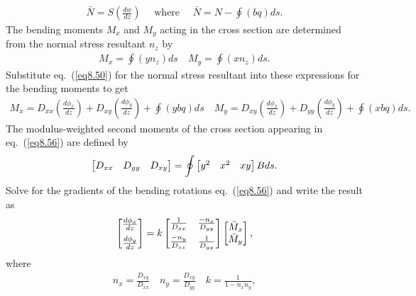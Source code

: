\documentclass{AeroStructure-ERJohnson}
\begin{document}
\begin{align}\label{eq8.54}
\bar{N}=S\left(\frac{d w}{d z}\right) \quad \text { where } \quad
\bar{N}=N-\oint(b q) d s.
\end{align}
The bending moments $M_x$ and $M_y$ acting in the cross section
are determined from the normal stress resultant $n_{z}$ by
\begin{align}\label{eq8.55}
M_{x}=\oint\left(y n_{z}\right) d s \quad M_{y}=\oint\left(x
n_{z}\right) d s.
\end{align}
Substitute eq.~(\ref{eq8.50}) for the normal stress resultant into
these expressions for the bending moments to get
\begin{align}\label{eq8.56}
M_{x}=D_{x x}\left(\frac{d \phi_{x}}{d z}\right)+D_{x
y}\left(\frac{d \phi_{y}}{d z}\right)+\oint(y b q) d s \quad
M_{y}=D_{x y}\left(\frac{d \phi_{x}}{d z}\right)+D_{y
y}\left(\frac{d \phi_{y}}{d z}\right)+\oint(x b q) d s.
\end{align}
The modulus-weighted second moments of the cross section appearing
in eq.~(\ref{eq8.56}) are defined by
\begin{align}\label{eq8.57}
\left[\begin{array}{@{}lll@{}}D_{x x} & D_{y y} & D_{x
y}\end{array}\right]=\oint\left[\begin{array}{@{}lll@{}}y^{2} & x^{2} &
x y\end{array}\right] B d s.
\end{align}
Solve for the gradients of the bending rotations
eq.~(\ref{eq8.56}) and write the result as
\begin{align}\label{eq8.58}
\left[\begin{array}{@{}c@{}}\frac{d \phi_{x}}{d z}\\
[6pt]
\frac{d
\phi_{y}}{d
z}\end{array}\right]=k\left[\begin{array}{@{}cc@{}}\frac{1}{D_{x
x}} & \frac{-n_{x}}{D_{y y}}\\
[6pt]
\frac{-n_{y}}{D_{x x}} &
\frac{1}{D_{y
y}}\end{array}\right]\left[\begin{array}{@{}l@{}}\bar{M}_{x}\\
\bar{M}_{y}\end{array}\right],
\end{align}
where
\begin{align}\label{eq8.59}
n_{x}=\frac{D_{x y}}{D_{x x}} \quad n_{y}=\frac{D_{x y}}{D_{y y}}
\quad k=\frac{1}{1-n_{x} n_{y}},
\end{align}
\end{document}
